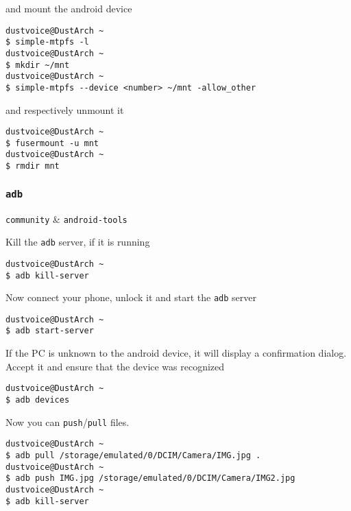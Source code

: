 \documentclass[10pt]{dustdoc}
\begin{document}
\noindent
and mount the android device

\begin{verbatim}
dustvoice@DustArch ~
$ simple-mtpfs -l
dustvoice@DustArch ~
$ mkdir ~/mnt
dustvoice@DustArch ~
$ simple-mtpfs --device <number> ~/mnt -allow_other
\end{verbatim}

\noindent
and respectively unmount it

\begin{verbatim}
dustvoice@DustArch ~
$ fusermount -u mnt
dustvoice@DustArch ~
$ rmdir mnt
\end{verbatim}

\subsubsection{\texttt{adb}}
\label{sec:adb}

\begin{packagetable}
    \texttt{community} & \texttt{android-tools} \\
\end{packagetable}

Kill the \texttt{adb} server, if it is running

\begin{verbatim}
dustvoice@DustArch ~
$ adb kill-server
\end{verbatim}


Now connect your phone, unlock it and start the \texttt{adb} server

\begin{verbatim}
dustvoice@DustArch ~
$ adb start-server
\end{verbatim}

If the PC is unknown to the android device, it will display a confirmation dialog.
Accept it and ensure that the device was recognized

\begin{verbatim}
dustvoice@DustArch ~
$ adb devices
\end{verbatim}

Now you can \texttt{push}/\texttt{pull} files.

\begin{verbatim}
dustvoice@DustArch ~
$ adb pull /storage/emulated/0/DCIM/Camera/IMG.jpg .
dustvoice@DustArch ~
$ adb push IMG.jpg /storage/emulated/0/DCIM/Camera/IMG2.jpg
dustvoice@DustArch ~
$ adb kill-server
\end{verbatim}
\end{document}
